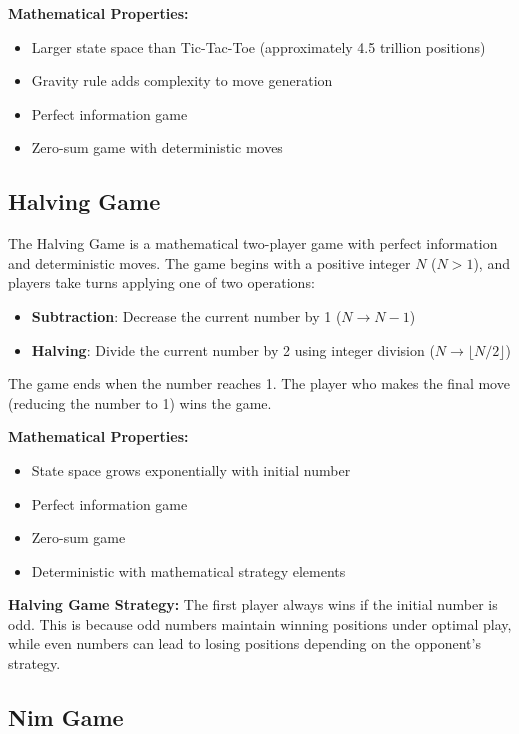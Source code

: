 \documentclass[12pt]{article}
\begin{document}
\textbf{Mathematical Properties:}
\begin{itemize}
    \item Larger state space than Tic-Tac-Toe (approximately 4.5 trillion positions)
    \item Gravity rule adds complexity to move generation
    \item Perfect information game
    \item Zero-sum game with deterministic moves
\end{itemize}

\subsection{Halving Game}

The Halving Game is a mathematical two-player game with perfect information and deterministic moves. The game begins with a positive integer $N$ ($N > 1$), and players take turns applying one of two operations:

\begin{itemize}
    \item \textbf{Subtraction}: Decrease the current number by 1 ($N \rightarrow N-1$)
    \item \textbf{Halving}: Divide the current number by 2 using integer division ($N \rightarrow \lfloor N/2 \rfloor$)
\end{itemize}

The game ends when the number reaches 1. The player who makes the final move (reducing the number to 1) wins the game.

\textbf{Mathematical Properties:}
\begin{itemize}
    \item State space grows exponentially with initial number
    \item Perfect information game
    \item Zero-sum game
    \item Deterministic with mathematical strategy elements
\end{itemize}

\textbf{Halving Game Strategy:} The first player always wins if the initial number is odd. This is because odd numbers maintain winning positions under optimal play, while even numbers can lead to losing positions depending on the opponent's strategy.

\subsection{Nim Game}
\end{document}
